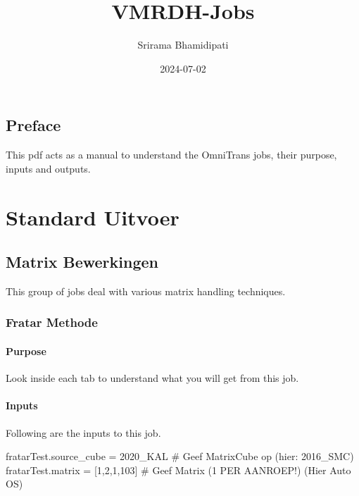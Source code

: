 \documentclass[
  letterpaper,
  DIV=11,
  numbers=noendperiod]{scrreprt}
\title{VMRDH-Jobs}
\author{Srirama Bhamidipati}
\date{2024-07-02}
\newenvironment{Shaded}{\begin{snugshade}}{\end{snugshade}}
\newcommand{\AttributeTok}[1]{\textcolor[rgb]{0.40,0.45,0.13}{#1}}
\newcommand{\CommentTok}[1]{\textcolor[rgb]{0.37,0.37,0.37}{#1}}
\newcommand{\DecValTok}[1]{\textcolor[rgb]{0.68,0.00,0.00}{#1}}
\newcommand{\KeywordTok}[1]{\textcolor[rgb]{0.00,0.23,0.31}{#1}}
\newcommand{\NormalTok}[1]{\textcolor[rgb]{0.00,0.23,0.31}{#1}}
\newcommand{\VerbatimStringTok}[1]{\textcolor[rgb]{0.13,0.47,0.30}{#1}}
\renewcommand*\contentsname{Table of contents}
\newcommand\contentsname{Table of contents}
\begin{document}
\maketitle

\renewcommand*\contentsname{Job index}
{
\hypersetup{linkcolor=blue}
\setcounter{tocdepth}{2}
\tableofcontents
}

\chapter*{Preface}\label{preface}


This pdf acts as a manual to understand the OmniTrans jobs, their
purpose, inputs and outputs.

\part{Standard Uitvoer}

\chapter{Matrix Bewerkingen}\label{matrix-bewerkingen}

This group of jobs deal with various matrix handling techniques.

\section{Fratar Methode}\label{fratar-methode}

\subsection{Purpose}

Look inside each tab to understand what you will get from this job.

\subsection{Inputs}

Following are the inputs to this job.

\begin{Shaded}
\begin{Highlighting}[]
\NormalTok{fratarTest}\AttributeTok{.source\_cube} \KeywordTok{=} \VerbatimStringTok{\textquotesingle{}2020\_KAL\textquotesingle{}} \CommentTok{\# Geef MatrixCube op (hier: 2016\_SMC)        }
\NormalTok{fratarTest}\AttributeTok{.matrix} \KeywordTok{=} \KeywordTok{[}\DecValTok{1}\NormalTok{,}\DecValTok{2}\NormalTok{,}\DecValTok{1}\NormalTok{,}\DecValTok{103}\KeywordTok{]}     \CommentTok{\# Geef Matrix (1 PER AANROEP!) (Hier Auto OS)}
\end{Highlighting}
\end{Shaded}
\end{document}
